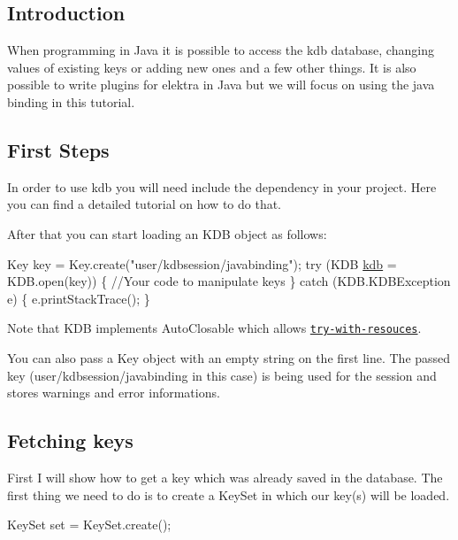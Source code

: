\subsection*{Introduction}

When programming in Java it is possible to access the kdb database, changing values of existing keys or adding new ones and a few other things. It is also possible to write plugins for elektra in Java but we will focus on using the java binding in this tutorial.

\subsection*{First Steps}

In order to use {\ttfamily kdb} you will need include the dependency in your project. Here you can find a detailed tutorial on how to do that.

After that you can start loading an {\ttfamily K\+DB} object as follows\+: 
\begin{DoxyCode}
Key key = Key.create(\textcolor{stringliteral}{"user/kdbsession/javabinding"});
\textcolor{keywordflow}{try} (KDB \hyperlink{namespacekdb}{kdb} = KDB.open(key)) \{
    \textcolor{comment}{//Your code to manipulate keys}
\} \textcolor{keywordflow}{catch} (KDB.KDBException e) \{
    e.printStackTrace();
\}
\end{DoxyCode}


Note that K\+DB implements {\ttfamily Auto\+Closable} which allows \href{https://docs.oracle.com/javase/tutorial/essential/exceptions/tryResourceClose.html}{\tt try-\/with-\/resouces}.

You can also pass a {\ttfamily Key} object with an empty string on the first line. The passed key ({\ttfamily user/kdbsession/javabinding} in this case) is being used for the session and stores warnings and error informations.

\subsection*{Fetching keys}

First I will show how to get a key which was already saved in the database. The first thing we need to do is to create a {\ttfamily Key\+Set} in which our key(s) will be loaded. 
\begin{DoxyCode}
KeySet \textcolor{keyword}{set} = KeySet.create();
\end{DoxyCode}


